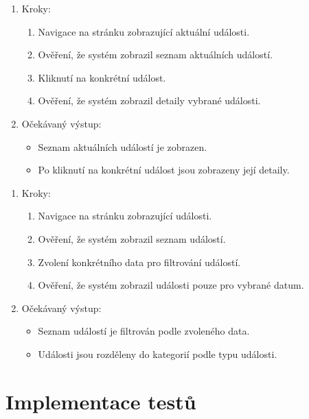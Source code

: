 
\begin{enumerate}
  \item Kroky:
    \begin{enumerate}
      \item Navigace na stránku zobrazující aktuální události.
      \item Ověření, že systém zobrazil seznam aktuálních událostí.
      \item Kliknutí na konkrétní událost.
      \item Ověření, že systém zobrazil detaily vybrané události.
    \end{enumerate}
  \item Očekávaný výstup:
    \begin{itemize}
      \item Seznam aktuálních událostí je zobrazen.
      \item Po kliknutí na konkrétní událost jsou zobrazeny její detaily.
    \end{itemize}
\end{enumerate}


\begin{enumerate}
  \item Kroky:
    \begin{enumerate}
      \item Navigace na stránku zobrazující události.
      \item Ověření, že systém zobrazil seznam událostí.
      \item Zvolení konkrétního data pro filtrování událostí.
      \item Ověření, že systém zobrazil události pouze pro vybrané datum.
    \end{enumerate}
  \item Očekávaný výstup:
    \begin{itemize}
      \item Seznam událostí je filtrován podle zvoleného data.
      \item Události jsou rozděleny do kategorií podle typu události.
    \end{itemize}
\end{enumerate}

\section{Implementace testů}


